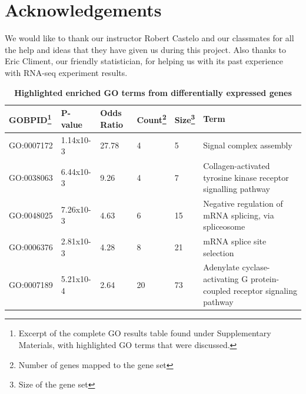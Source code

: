 \documentclass[9pt,twocolumn,twoside]{gsajnl}
\begin{document}
\section{Acknowledgements}

We would like to thank our instructor Robert Castelo and our classmates for all the help and ideas that they have given us during this project. Also thanks to Eric Climent, our friendly statistician, for helping us with its past experience with RNA-seq experiment results.



\renewcommand{\arraystretch}{3}
\begin{table}[htbp]
\centering
\caption{ \bf {Highlighted enriched GO terms from differentially expressed genes}}
\begin{tableminipage}{\textwidth}
\begin{tabularx}{\textwidth}{sssssX}
  \hline
  GOBPID\footnote{Excerpt of the complete GO results table found under Supplementary Materials, with highlighted GO terms that were discussed.} & P-value & Odds Ratio & Count\footnote{Number of genes mapped to the gene set} & Size\footnote{Size of the gene set} & Term \\ 
  \hline
GO:0007172 & 1.14x10-3 & 27.78 &   4 &   5 & Signal complex assembly  \\
GO:0038063& 6.44x10-3 & 9.26 &   4 &   7 & Collagen-activated tyrosine kinase receptor signalling pathway  \\ 
GO:0048025 & 7.26x10-3 & 4.63 &   6 &  15 & Negative regulation of mRNA splicing, via spliceosome  \\ 
GO:0006376 & 2.81x10-3 & 4.28 &   8 &  21 & mRNA splice site selection  \\ 
GO:0007189 & 5.21x10-4 & 2.64 &  20 &  73 & Adenylate cyclase-activating G protein-coupled receptor signaling pathway  \\ 
\hline
\end{tabularx}
  \label{tab:go-terms}
\end{tableminipage}
\end{table}
\end{document}

